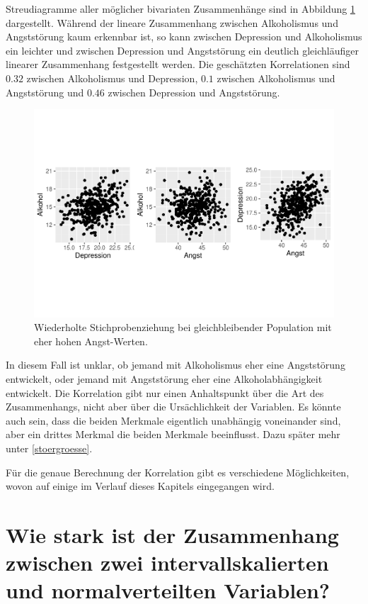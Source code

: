 \documentclass[
]{book}
\theoremstyle{definition}
\theoremstyle{definition}
\theoremstyle{definition}
\theoremstyle{definition}
\theoremstyle{remark}
\begin{document}
Streudiagramme aller möglicher bivariaten Zusammenhänge sind in Abbildung \ref{fig:exm-depression-alkohol-angst-scatter} dargestellt. Während der lineare Zusammenhang zwischen Alkoholismus und Angststörung kaum erkennbar ist, so kann zwischen Depression und Alkoholismus ein leichter und zwischen Depression und Angststörung ein deutlich gleichläufiger linearer Zusammenhang festgestellt werden. Die geschätzten Korrelationen sind \(0.32\) zwischen Alkoholismus und Depression, \(0.1\) zwischen Alkoholismus und Angststörung und \(0.46\) zwischen Depression und Angststörung.

\begin{figure}
\centering
\includegraphics{aps_statistik1_files/figure-latex/exm-depression-alkohol-angst-scatter-1.pdf}
\caption{\label{fig:exm-depression-alkohol-angst-scatter}Wiederholte Stichprobenziehung bei gleichbleibender Population mit eher hohen Angst-Werten.}
\end{figure}

In diesem Fall ist unklar, ob jemand mit Alkoholismus eher eine Angststörung entwickelt, oder jemand mit Angststörung eher eine Alkoholabhängigkeit entwickelt. Die Korrelation gibt nur einen Anhaltspunkt über die Art des Zusammenhangs, nicht aber über die Ursächlichkeit der Variablen. Es könnte auch sein, dass die beiden Merkmale eigentlich unabhängig voneinander sind, aber ein drittes Merkmal die beiden Merkmale beeinflusst. Dazu später mehr unter \ref{stoergroesse}.

Für die genaue Berechnung der Korrelation gibt es verschiedene Möglichkeiten, wovon auf einige im Verlauf dieses Kapitels eingegangen wird.

\section{Wie stark ist der Zusammenhang zwischen zwei intervallskalierten und normalverteilten Variablen?}\label{wie-stark-ist-der-zusammenhang-zwischen-zwei-intervallskalierten-und-normalverteilten-variablen}
\end{document}
